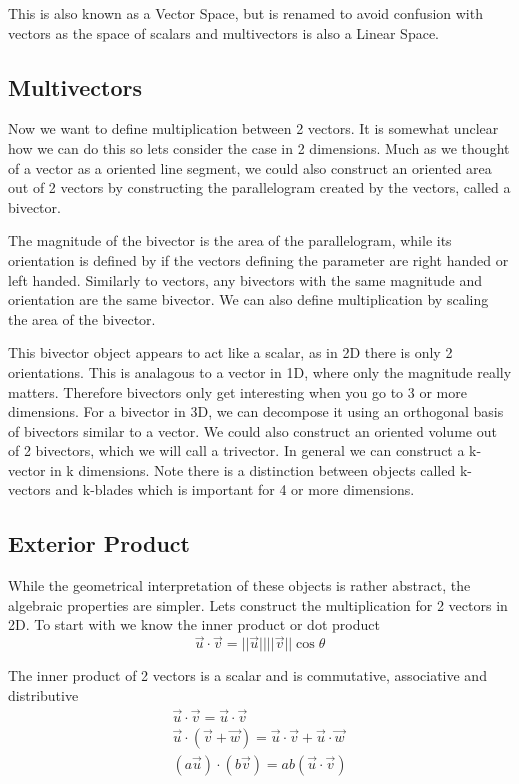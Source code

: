 \documentclass[options]{report}
\def \u{\vec{u}}
\def \v{\vec{v}}
\def \w{\vec{w}}
\begin{document}
This is also known as a Vector Space, but is renamed to avoid confusion with vectors as the space of scalars and multivectors is also a Linear Space.

\subsection{Multivectors}
Now we want to define multiplication between 2 vectors. It is somewhat unclear how we can do this so lets consider the case in 2 dimensions. Much as we thought of a vector as a oriented line segment, we could also construct an oriented area out of 2 vectors by constructing the parallelogram created by the vectors, called a bivector.

The magnitude of the bivector is the area of the parallelogram, while its orientation is defined by if the vectors defining the parameter are right handed or left handed. Similarly to vectors, any bivectors with the same magnitude and orientation are the same bivector. We can also define multiplication by scaling the area of the bivector.

This bivector object appears to act like a scalar, as in 2D there is only 2 orientations. This is analagous to a vector in 1D, where only the magnitude really matters. Therefore bivectors only get interesting when you go to 3 or more dimensions. For a bivector in 3D, we can decompose it using an orthogonal basis of bivectors similar to a vector. We could also construct an oriented volume out of 2 bivectors, which we will call a trivector. In general we can construct a k-vector in k dimensions. Note there is a distinction between objects called k-vectors and k-blades which is important for 4 or more dimensions.

\subsection{Exterior Product}
While the geometrical interpretation of these objects is rather abstract, the algebraic properties are simpler. Lets construct the multiplication for 2 vectors in 2D. To start with we know the inner product or dot product
\begin{equation}
	\u \cdot \v = ||\u|| ||\v|| \cos \theta
\end{equation}

The inner product of 2 vectors is a scalar and is commutative, associative and distributive
\begin{equation}
	\begin{gathered}
		\u \cdot \v = \u \cdot \v \\
		\u \cdot (\v + \w) = \u \cdot \v + \u \cdot \w \\
		(a \u) \cdot (b \v) = ab (\u \cdot \v) \\
	\end{gathered}
\end{equation}
\end{document}
